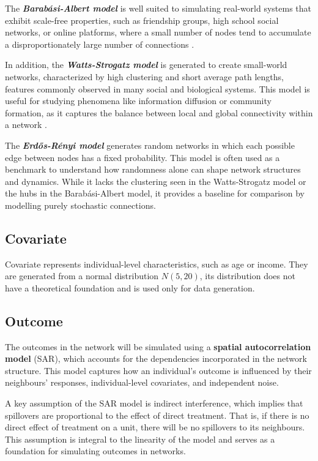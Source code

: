 \documentclass[a4paper,11pt]{article}
\begin{document}
The \textit{\textbf{Barabási-Albert model}} is well suited to simulating real-world systems that exhibit scale-free properties, such as friendship groups, high school social networks, or online platforms, where a small number of nodes tend to accumulate a disproportionately large number of connections \cite{bertotti2019configuration}. 

In addition, the \textit{\textbf{Watts-Strogatz model}} is generated to create small-world networks, characterized by high clustering and short average path lengths, features commonly observed in many social and biological systems. This model is useful for studying phenomena like information diffusion or community formation, as it captures the balance between local and global connectivity within a network \cite{song2014simple}.

The \textit{\textbf{Erdős-Rényi model}} generates random networks in which each possible edge between nodes has a fixed probability. This model is often used as a benchmark to understand how randomness alone can shape network structures and dynamics. While it lacks the clustering seen in the Watts-Strogatz model or the hubs in the Barabási-Albert model, it provides a baseline for comparison by modelling purely stochastic connections.

\subsection{Covariate}
Covariate represents individual-level characteristics, such as age or income. They are generated from a normal distribution $N(5, 20)$, its distribution does not have a theoretical foundation and is used only for data generation. 

\subsection{Outcome}
The outcomes in the network will be simulated using a \textbf{spatial autocorrelation model} (SAR), which accounts for the dependencies incorporated in the network structure. This model captures how an individual’s outcome is influenced by their neighbours' responses, individual-level covariates, and independent noise. 

A key assumption of the SAR model is indirect interference, which implies that spillovers are proportional to the effect of direct treatment. That is, if there is no direct effect of treatment on a unit, there will be no spillovers to its neighbours. This assumption is integral to the linearity of the model and serves as a foundation for simulating outcomes in networks.
\end{document}
